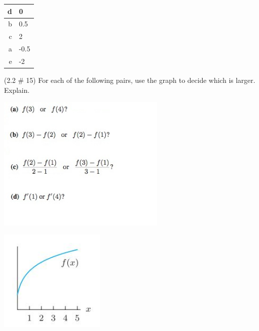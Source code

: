 \documentclass[11pt]{exam}
\begin{document}
\begin{questions}
         \begin{solution}
           \begin{tabular}{|r|l|}
             \hline
             d & 0\\
             \hline 
             b & 0.5\\
             \hline
             c & 2\\
             \hline
             a & -0.5\\
             \hline
             e & -2\\
             \hline
           \end{tabular}
         \end{solution}
\question (2.2 \# 15) For each of the following pairs, use the graph to decide which is larger.  Explain.\\
  \begin{minipage}{0.5\linewidth}
    \includegraphics[width=3.2in]{Figures/no15.jpg}
  \end{minipage}
  \begin{minipage}{0.5\linewidth}
    \includegraphics[width=2in]{Figures/no15graph.jpg}
  \end{minipage}
         \begin{solution}
           \begin{enumerate}[(a)]

\end{enumerate}
\end{solution}
\end{questions}
\end{document}
